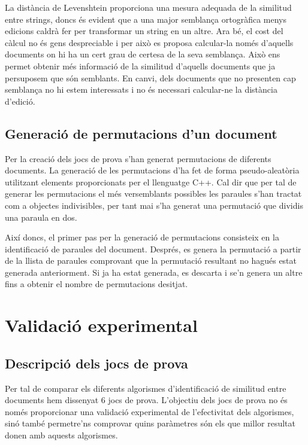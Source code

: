 \documentclass[catalan, 12pt]{report}
\begin{document}
La distància de Levenshtein proporciona una mesura adequada de la similitud entre strings, doncs és evident que a una major semblança ortogràfica menys edicions caldrà fer per transformar un string en un altre. Ara bé, el cost del càlcul no és gens despreciable i per això es proposa calcular-la només d'aquells documents on hi ha un cert grau de certesa de la seva semblança. Això ens permet obtenir més informació de la similitud d'aquells documents que ja persuposem que són semblants. En canvi, dels documents que no presenten cap semblança no hi estem interessats i no és necessari calcular-ne la distància d'edició.

\section{Generació de permutacions d'un document}

Per la creació dels jocs de prova s'han generat permutacions de diferents documents. La generació de les permutacions d'ha fet de forma pseudo-aleatòria utilitzant elements proporcionats per el llenguatge C++. Cal dir que per tal de generar les permutacions el més versemblants possibles les paraules s'han tractat com a objectes indivisibles, per tant mai s'ha generat una permutació que dividis una paraula en dos. \newline

Així doncs, el primer pas per la generació de permutacions consisteix en la identificació de paraules del document. Després, es genera la permutació a partir de la llista de paraules comprovant que la permutació resultant no hagués estat generada anteriorment. Si ja ha estat generada, es descarta i se'n genera un altre fins a obtenir el nombre de permutacions desitjat.

\chapter{Validació experimental}
\section{Descripció dels jocs de prova}

Per tal de comparar els diferents algorismes d'identificació de similitud entre documents hem dissenyat 6 jocs de prova. L'objectiu dels jocs de prova no és només proporcionar una validació experimental de l'efectivitat dels algorismes, sinó també permetre'ns comprovar quins paràmetres són els que millor resultat donen amb aquests algorismes. \newline
\end{document}
